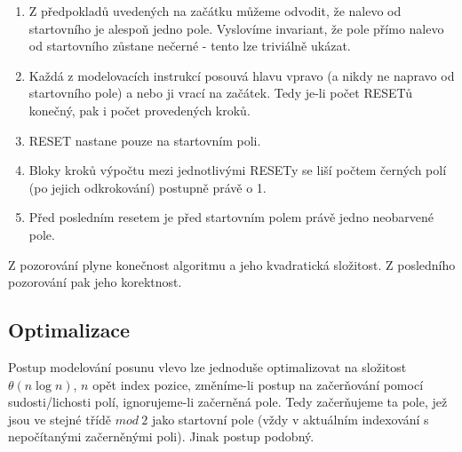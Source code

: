 \documentclass[a4paper,12pt]{article} %
\begin{document}
\begin{enumerate}
    \item Z předpokladů uvedených na začátku můžeme odvodit, že nalevo od startovního je alespoň jedno pole. Vyslovíme invariant, že pole přímo nalevo od startovního zůstane nečerné - tento lze triviálně ukázat.

    \item Každá z modelovacích instrukcí posouvá hlavu vpravo (a nikdy ne napravo od startovního pole) a nebo ji vrací na začátek. Tedy je-li počet RESETů konečný, pak i počet provedených kroků.

    \item RESET nastane pouze na startovním poli.

    \item Bloky kroků výpočtu mezi jednotlivými RESETy se liší počtem černých polí (po jejich odkrokování) postupně právě o 1.

    \item Před posledním resetem je před startovním polem právě jedno neobarvené pole.
\end{enumerate}

Z pozorování plyne konečnost algoritmu a jeho kvadratická složitost. Z posledního pozorování pak jeho korektnost.

\subsection*{Optimalizace}

Postup modelování posunu vlevo lze jednoduše optimalizovat na složitost $\theta(n \log n)$, $n$ opět index pozice, změníme-li postup na začerňování pomocí sudosti/lichosti polí, ignorujeme-li začerněná pole. Tedy začerňujeme ta pole, jež jsou ve stejné třídě $mod\ 2$ jako startovní pole (vždy v aktuálním indexování s nepočítanými začerněnými poli). Jinak postup podobný.
\end{document}
